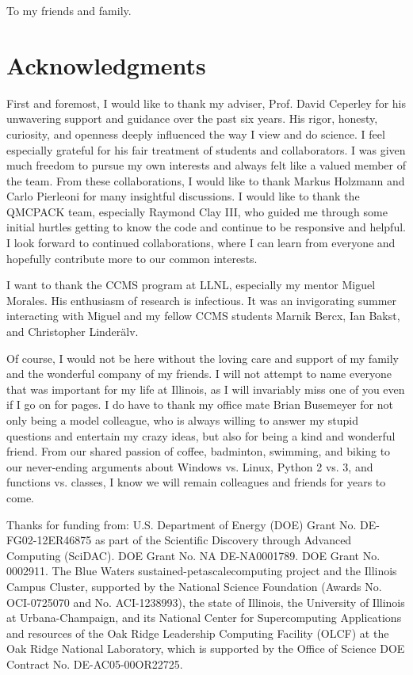 \begin{dedication}
To my friends and family.
\end{dedication}

\chapter*{Acknowledgments}
First and foremost, I would like to thank my adviser, Prof. David Ceperley for his unwavering support and guidance over the past six years.
His rigor, honesty, curiosity, and openness deeply influenced the way I view and do science.
I feel especially grateful for his fair treatment of students and collaborators.
I was given much freedom to pursue my own interests and always felt like a valued member of the team.
From these collaborations, I would like to thank Markus Holzmann and Carlo Pierleoni for many insightful discussions.
I would like to thank the QMCPACK team, especially Raymond Clay III, who guided me through some initial hurtles getting to know the code and continue to be responsive and helpful.
I look forward to continued collaborations, where I can learn from everyone and hopefully contribute more to our common interests.

I want to thank the CCMS program at LLNL, especially my mentor Miguel Morales.
His enthusiasm of research is infectious.
It was an invigorating summer interacting with Miguel and my fellow CCMS students Marnik Bercx, Ian Bakst, and Christopher Linder\"alv.

Of course, I would not be here without the loving care and support of my family and the wonderful company of my friends. I will not attempt to name everyone that was important for my life at Illinois, as I will invariably miss one of you even if I go on for pages.
I do have to thank my office mate Brian Busemeyer for not only being a model colleague, who is always willing to answer my stupid questions and entertain my crazy ideas, but also for being a kind and wonderful friend.
From our shared passion of coffee, badminton, swimming, and biking to our never-ending arguments about Windows vs. Linux, Python 2 vs. 3, and functions vs. classes, I know we will remain colleagues and friends for years to come.

Thanks for funding from:
U.S. Department of Energy (DOE) Grant No. DE-FG02-12ER46875 as part of the Scientific Discovery through Advanced Computing (SciDAC). DOE Grant No. NA DE-NA0001789. DOE Grant No. 0002911. The Blue Waters sustained-petascalecomputing project and the Illinois Campus Cluster, supported by the National Science Foundation (Awards No. OCI-0725070 and No. ACI-1238993), the state of Illinois, the University of Illinois at Urbana-Champaign, and its National Center for Supercomputing Applications and resources of the Oak Ridge Leadership Computing Facility (OLCF) at the Oak  Ridge National Laboratory, which is supported by the Office of Science DOE Contract No. DE-AC05-00OR22725.
